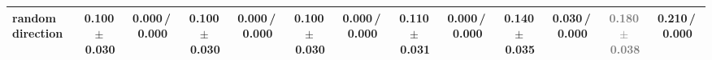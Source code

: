 \begin{tabular}{@{}lcccccccccccc@{}}
random direction & 0.100\,{\scriptsize$\pm$\,0.030} & {\scriptsize 0.000\,/\,0.000} & 0.100\,{\scriptsize$\pm$\,0.030} & {\scriptsize 0.000\,/\,0.000} & 0.100\,{\scriptsize$\pm$\,0.030} & {\scriptsize 0.000\,/\,0.000} & 0.110\,{\scriptsize$\pm$\,0.031} & {\scriptsize 0.000\,/\,0.000} & \textbf{0.140\,{\scriptsize$\pm$\,0.035}} & {\scriptsize 0.030\,/\,0.000} & \textcolor{gray}{0.180\,{\scriptsize$\pm$\,0.038}} & {\scriptsize 0.210\,/\,0.000} \\
\bottomrule
\end{tabular}

